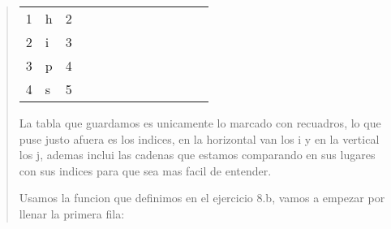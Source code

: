 \begin{quote}
\begin{table}[H]
\begin{tabular}{lllllllllllll}
          1 & h & \multicolumn{1}{l|}{2} & \multicolumn{1}{l|}{}  & \multicolumn{1}{l|}{} & \multicolumn{1}{l|}{} & \multicolumn{1}{l|}{} & \multicolumn{1}{l|}{} & \multicolumn{1}{l|}{} & \multicolumn{1}{l|}{} & \multicolumn{1}{l|}{} & \multicolumn{1}{l|}{} & \multicolumn{1}{l|}{} \\ \cline{4-13} 
          2 & i & \multicolumn{1}{l|}{3} & \multicolumn{1}{l|}{}  & \multicolumn{1}{l|}{} & \multicolumn{1}{l|}{} & \multicolumn{1}{l|}{} & \multicolumn{1}{l|}{} & \multicolumn{1}{l|}{} & \multicolumn{1}{l|}{} & \multicolumn{1}{l|}{} & \multicolumn{1}{l|}{} & \multicolumn{1}{l|}{} \\ \cline{4-13} 
          3 & p & \multicolumn{1}{l|}{4} & \multicolumn{1}{l|}{}  & \multicolumn{1}{l|}{} & \multicolumn{1}{l|}{} & \multicolumn{1}{l|}{} & \multicolumn{1}{l|}{} & \multicolumn{1}{l|}{} & \multicolumn{1}{l|}{} & \multicolumn{1}{l|}{} & \multicolumn{1}{l|}{} & \multicolumn{1}{l|}{} \\ \cline{4-13} 
          4 & s & \multicolumn{1}{l|}{5} & \multicolumn{1}{l|}{}  & \multicolumn{1}{l|}{} & \multicolumn{1}{l|}{} & \multicolumn{1}{l|}{} & \multicolumn{1}{l|}{} & \multicolumn{1}{l|}{} & \multicolumn{1}{l|}{} & \multicolumn{1}{l|}{} & \multicolumn{1}{l|}{} & \multicolumn{1}{l|}{} \\ \cline{4-13} 
          \end{tabular}
    \end{table}

    La tabla que guardamos es unicamente lo marcado con recuadros, lo que puse justo afuera es los indices, en la horizontal van los i y en la vertical los j, ademas inclui las cadenas que estamos comparando en sus lugares con sus indices para que sea mas facil de entender. \vspace{.2cm}

    Usamos la funcion que definimos en el ejercicio 8.b, vamos a empezar por llenar la primera fila: \vspace{.2cm}


\end{quote}
